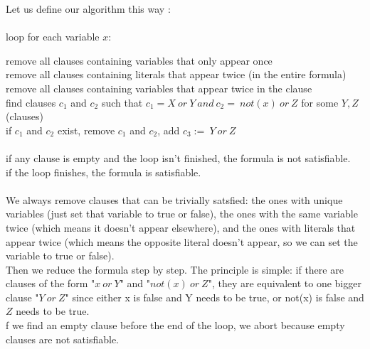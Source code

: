 Let us define our algorithm this way :\\\\
loop for each variable $x$:\

remove all clauses containing variables that only appear once	\\

remove all clauses containing literals that appear twice (in the entire formula)\\

remove all clauses containing variables that appear twice in the clause\\

find clauses $c_1$ and $c_2$ such that $c_1 = X\ or\ Y\ and\ c_2 =\ not(x)\ or\ Z$ for some $Y,Z$ (clauses)\\

if $c_1$ and $c_2$ exist, remove $c_1$ and $c_2$, add $c_3 :=\ Y\ or\ Z$\\\\
if any clause is empty and the loop isn't finished, the formula is not satisfiable.\\
if the loop finishes, the formula is satisfiable.\\\\


We always remove clauses that can be trivially satsfied: the ones with unique variables (just set that variable to true or false), the ones with the same variable twice (which means it doesn't appear elsewhere), and the ones with literals that appear twice (which means the opposite literal doesn't appear, so we can set the variable to true or false).\\

Then we reduce the formula step by step. The principle is simple: if there are clauses of the form "$x\ or\ Y$" and "$not(x)\ or\ Z$", they are equivalent to one bigger clause "$Y\ or\ Z$" since either x is false and Y needs to be true, or not(x) is false and $Z$ needs to be true.\\

f we find an empty clause before the end of the loop, we abort because empty clauses are not satisfiable.
